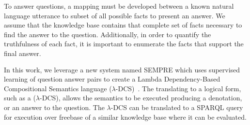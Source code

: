 To answer questions, a mapping must be developed between a known
natural language utterance to subset of all possible facts to present an answer.
We assume that the knowledge base contains that complete set of facts necessary
to find the answer to the question.
Additionally, in order to quantify the truthfulness of each fact, it is
important to enumerate the facts that support the final answer.


In this work, we leverage a new system named SEMPRE which uses supervised
learning of question answer pairs to create a Lambda Dependency-Based
Compositional Semantics language (\(\lambda\)-DCS)~\cite{berant2013semantic}.
The translating to a logical form, such as a (\(\lambda\)-DCS), allows the
semantics to be executed producing a denotation, or an answer to the question.
The \(\lambda\)-DCS can be translated to a SPARQL query for execution over 
freebase of a similar knowledge base where it can be evaluated.



